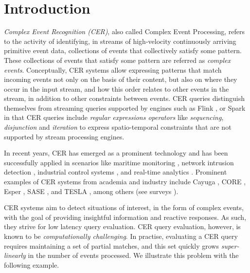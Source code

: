\chapter{Introduction}\label{chapter:introduction}

\emph{Complex Event Recognition (CER)}, also called Complex Event Processing, refers to the activity of identifying, in streams of high-velocity continuously arriving primitive event data, collections of events that collectively satisfy some pattern.
These collections of events that satisfy some pattern are referred as \emph{complex events}. Conceptually, CER systems allow expressing patterns that match incoming events not only on the basis of their content, but also on where they occur in the input stream, and how this order relates to other events in the stream, in addition to other constraints between events. CER queries distinguish themselves from streaming queries supported by engines such as Flink \cite{flink}, or Spark \cite{spark} in that CER queries include \emph{regular expressions operators} like \emph{sequencing}, \emph{disjunction} and \emph{iteration} to express spatio-temporal constraints that are not supported by stream processing engines.

In recent years, CER has emerged as a prominent technology and has been successfully applied in scenarios like maritime monitoring \cite{maritime-monitoring}, network intrusion detection \cite{network-intrusion-detection}, industrial control systems \cite{industrial-control}, and real-time analytics \cite{real-time-analytics}. Prominent examples of CER systems from academia and industry include Cayuga \cite{cayuga}, CORE \cite{core}, Esper \cite{esper}, SASE \cite{sase}, and TESLA \cite{tesla}, among others (see surveys \cite{survey-systems-1,survey-systems-2}).

CER systems aim to detect situations of interest, in the form of complex events, with the goal of providing insightful information and reactive responses. As such, they strive for low latency query evaluation. CER query evaluation, however, is known to be \emph{computationally challenging}. In practise, evaluating a CER query requires maintaining a set of partial matches, and this set quickly grows \emph{super-linearly} in the number of events processed. We illustrate this problem with the following example.


